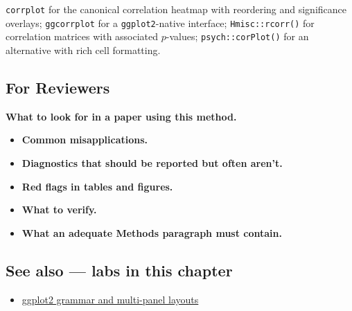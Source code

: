 \documentclass[
]{article}
\providecommand{\tightlist}{%
  \setlength{\itemsep}{0pt}\setlength{\parskip}{0pt}}
\begin{document}
\texttt{corrplot} for the canonical correlation heatmap with reordering
and significance overlays; \texttt{ggcorrplot} for a
\texttt{ggplot2}-native interface; \texttt{Hmisc::rcorr()} for
correlation matrices with associated \(p\)-values;
\texttt{psych::corPlot()} for an alternative with rich cell formatting.

\subsection{For Reviewers}\label{for-reviewers}

\textbf{What to look for in a paper using this method.}

\begin{itemize}
\tightlist
\item
  \textbf{Common misapplications.}
\item
  \textbf{Diagnostics that should be reported but often aren't.}
\item
  \textbf{Red flags in tables and figures.}
\item
  \textbf{What to verify.}
\item
  \textbf{What an adequate Methods paragraph must contain.}
\end{itemize}

\subsection{See also --- labs in this
chapter}\label{see-also-labs-in-this-chapter}

\begin{itemize}
\tightlist
\item
  \href{labs/lab-ggplot2-grammar-and-multi-panel-layouts.Rmd}{ggplot2
  grammar and multi-panel layouts}
\end{itemize}
\end{document}
